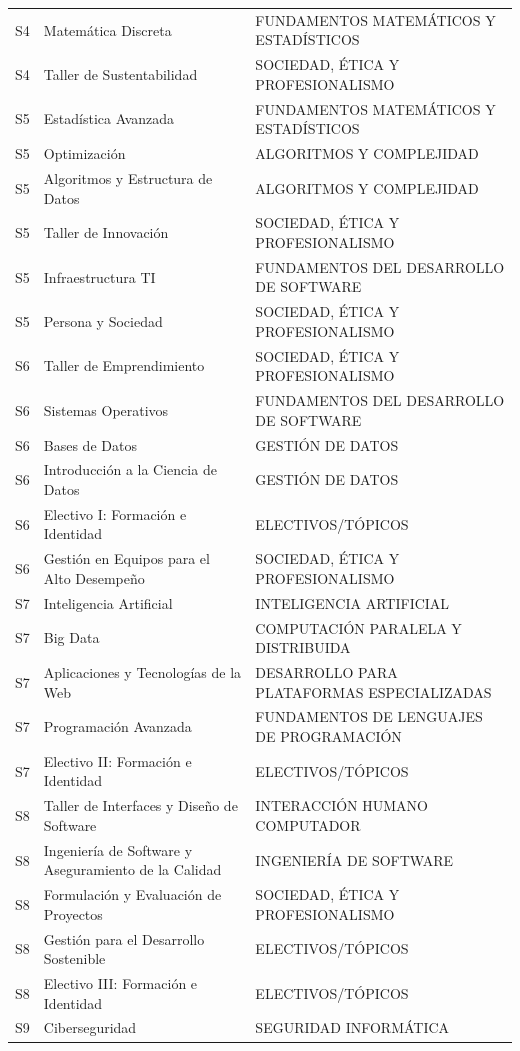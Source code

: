\documentclass[11pt,a4paper]{article}
\begin{document}
\begin{small}
\begin{longtable}{c >{\raggedright\arraybackslash}p{8.5cm} >{\raggedright\arraybackslash}p{5.5cm}}
S4 & Matemática Discreta & FUNDAMENTOS MATEMÁTICOS Y ESTADÍSTICOS \\
S4 & Taller de Sustentabilidad & SOCIEDAD, ÉTICA Y PROFESIONALISMO \\
S5 & Estadística Avanzada & FUNDAMENTOS MATEMÁTICOS Y ESTADÍSTICOS \\
S5 & Optimización & ALGORITMOS Y COMPLEJIDAD \\
S5 & Algoritmos y Estructura de Datos & ALGORITMOS Y COMPLEJIDAD \\
S5 & Taller de Innovación & SOCIEDAD, ÉTICA Y PROFESIONALISMO \\
S5 & Infraestructura TI & FUNDAMENTOS DEL DESARROLLO DE SOFTWARE \\
S5 & Persona y Sociedad & SOCIEDAD, ÉTICA Y PROFESIONALISMO \\
S6 & Taller de Emprendimiento & SOCIEDAD, ÉTICA Y PROFESIONALISMO \\
S6 & Sistemas Operativos & FUNDAMENTOS DEL DESARROLLO DE SOFTWARE \\
S6 & Bases de Datos & GESTIÓN DE DATOS \\
S6 & Introducción a la Ciencia de Datos & GESTIÓN DE DATOS \\
S6 & Electivo I: Formación e Identidad & ELECTIVOS/TÓPICOS \\
S6 & Gestión en Equipos para el Alto Desempeño & SOCIEDAD, ÉTICA Y PROFESIONALISMO \\
S7 & Inteligencia Artificial & INTELIGENCIA ARTIFICIAL \\
S7 & Big Data & COMPUTACIÓN PARALELA Y DISTRIBUIDA \\
S7 & Aplicaciones y Tecnologías de la Web & DESARROLLO PARA PLATAFORMAS ESPECIALIZADAS \\
S7 & Programación Avanzada & FUNDAMENTOS DE LENGUAJES DE PROGRAMACIÓN \\
S7 & Electivo II: Formación e Identidad & ELECTIVOS/TÓPICOS \\
S8 & Taller de Interfaces y Diseño de Software & INTERACCIÓN HUMANO COMPUTADOR \\
S8 & Ingeniería de Software y Aseguramiento de la Calidad & INGENIERÍA DE SOFTWARE \\
S8 & Formulación y Evaluación de Proyectos & SOCIEDAD, ÉTICA Y PROFESIONALISMO \\
S8 & Gestión para el Desarrollo Sostenible & ELECTIVOS/TÓPICOS \\
S8 & Electivo III: Formación e Identidad & ELECTIVOS/TÓPICOS \\
S9 & Ciberseguridad & SEGURIDAD INFORMÁTICA \\

\end{longtable}
\end{small}
\end{document}
